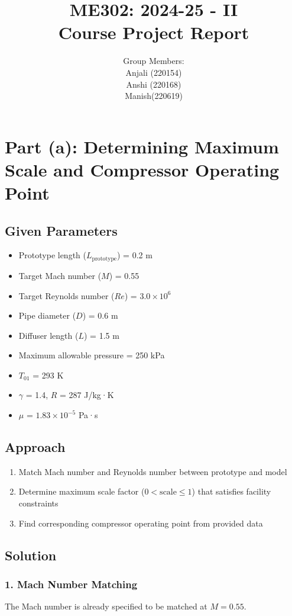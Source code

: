 \documentclass[12pt]{article}
\title{ME302: 2024-25 - II \\ Course Project Report}
\author{Group Members: \\ Anjali  (220154) \\ Anshi (220168) \\ Manish(220619)}
\date{}
\begin{document}
\maketitle

\section*{Part (a): Determining Maximum Scale and Compressor Operating Point}

\subsection*{Given Parameters}
\begin{itemize}
    \item Prototype length ($L_{\text{prototype}}$) = 0.2 m
    \item Target Mach number ($M$) = 0.55
    \item Target Reynolds number ($Re$) = $3.0 \times 10^6$
    \item Pipe diameter ($D$) = 0.6 m
    \item Diffuser length ($L$) = 1.5 m
    \item Maximum allowable pressure = 250 kPa
    \item $T_{01}$ = 293 K
    \item $\gamma$ = 1.4, $R$ = 287 J/kg·K
    \item $\mu$ = $1.83 \times 10^{-5}$ Pa·s
\end{itemize}

\subsection*{Approach}
\begin{enumerate}
    \item Match Mach number and Reynolds number between prototype and model
    \item Determine maximum scale factor ($0 < \text{scale} \leq 1$) that satisfies facility constraints
    \item Find corresponding compressor operating point from provided data
\end{enumerate}

\subsection*{Solution}

\subsubsection*{1. Mach Number Matching}
The Mach number is already specified to be matched at $M = 0.55$.
\end{document}
